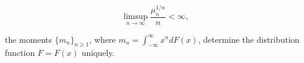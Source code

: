 $$\limsup_{n \to \infty} \frac{\mu_n^{1/n}}{n} < \infty,$$

the moments $\{m_n\}_{n \geq 1}$, where $m_n = \int_{-\infty}^{\infty} x^n dF(x)$, determine the distribution function $F = F(x)$ uniquely.
